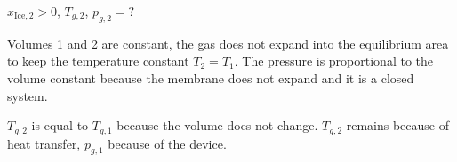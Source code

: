 \( x_{\text{Ice},2} > 0 \), \( T_{g,2} \), \( p_{g,2} = ? \)  

Volumes 1 and 2 are constant, the gas does not expand into the equilibrium area to keep the temperature constant \( T_2 = T_1 \).  
The pressure is proportional to the volume constant because the membrane does not expand and it is a closed system.  

\( T_{g,2} \) is equal to \( T_{g,1} \) because the volume does not change.  
\( T_{g,2} \) remains because of heat transfer, \( p_{g,1} \) because of the device.
